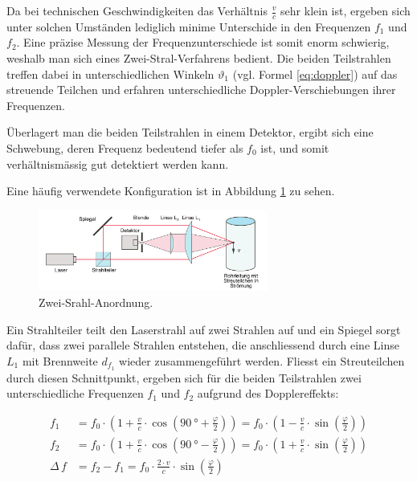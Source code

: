 Da  bei  technischen  Geschwindigkeiten das  Verh\"altnis  $\frac{v}{c}$  sehr
klein   ist,  ergeben   sich  unter   solchen  Umst\"anden   lediglich  minime
Unterschide  in den  Frequenzen $f_1$  und $f_2$. Eine  pr\"azise Messung  der
Frequenzunterschiede  ist  somit  enorm  schwierig,  weshalb  man  sich  eines
Zwei-Stral-Verfahrens  bedient. Die  beiden   Teilstrahlen  treffen  dabei  in
unterschiedlichen Winkeln $\vartheta_1$ (vgl. Formel \ref{eq:doppler}) auf das
streuende Teilchen und  erfahren unterschiedliche Doppler-Verschiebungen ihrer
Frequenzen.

\"Uberlagert  man  die beiden  Teilstrahlen  in  einem Detektor,  ergibt  sich
eine  Schwebung, deren  Frequenz bedeutend  tiefer  als $f_0$  ist, und  somit
verh\"altnism\"assig gut detektiert werden kann.

Eine     h\"aufig     verwendete     Konfiguration    ist     in     Abbildung
\ref{fig:zweistrahl-anordnung} zu sehen.

\begin{figure}[h!t]
    \centering
    \includegraphics[width=0.67\textwidth]{images/zweistrahl-anordnung.png}
    \caption{%
        Zwei-Srahl-Anordnung. \quelleVA
    }
    \label{fig:zweistrahl-anordnung}
\end{figure}

Ein Strahlteiler teilt  den Laserstrahl auf zwei Strahlen auf  und ein Spiegel
sorgt  daf\"ur,  dass zwei  parallele  Strahlen  entstehen, die  anschliessend
durch  eine  Linse $L_1$  mit  Brennweite  $d_{f_1}$ wieder  zusammengef\"uhrt
werden. Fliesst  ein Streuteilchen  durch  diesen  Schnittpunkt, ergeben  sich
f\"ur die beiden Teilstrahlen zwei unterschiedliche Frequenzen $f_1$ und $f_2$
aufgrund des Dopplereffekts:

\begin{align}
    \label{eq:splitFreqs1}
        f_1 &= f_0 \cdot
            \left(
                1 + \frac{v}{c} \cdot \cos\left( \SI{90}{\degree} + \frac{\varphi}{2} \right)
            \right)
            =
            f_0 \cdot
            \left(
                1 - \frac{v}{c} \cdot \sin\left(\frac{\varphi}{2}\right)
            \right)
            \\
        \label{eq:splitFreqs2}
        f_2 &= f_0 \cdot
            \left(
                1 + \frac{v}{c} \cdot \cos\left( \SI{90}{\degree} - \frac{\varphi}{2} \right)
            \right)
            =
            f_0 \cdot
            \left(
                1 + \frac{v}{c} \cdot \sin\left(\frac{\varphi}{2}\right)
            \right)
            \\
        \label{eq:splitFreqsDelta}
        \Delta\,f &= f_2 - f_1 = f_0 \cdot \frac{2 \cdot v}{c} \cdot \sin\left( \frac{\varphi}{2}\right)
\end{align}

